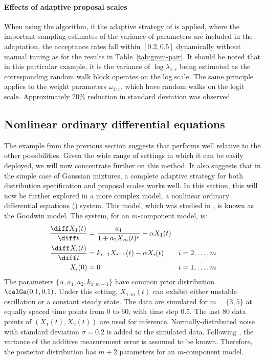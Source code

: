 \paragraph{Effects of adaptive proposal scales}

When using the \smc[2] algorithm, if the adaptive strategy of
\cite{Andrieu:2006tw} is applied, where the important sampling estimates of
the variance of parameters are included in the adaptation, the acceptance
rates fall within $[0.2, 0.5]$ dynamically without manual tuning as for the
results in Table~\ref{tab:gmm-pair}. It should be noted that in this
particular example, it is the variance of $\log\lambda_{1:r}$ being estimated
as the corresponding random walk block operates on the log scale. The same
principle applies to the weight parameters $\omega_{1:r}$, which have random
walks on the logit scale. Approximately 20\% reduction in standard deviation
was observed.

\subsection{Nonlinear ordinary differential equations}
\label{sub:Nonlinear ordinary differential equations}

The example from the previous section suggests that \smc[2] performs well
relative to the other \smc possibilities. Given the wide range of settings in
which it can be easily deployed, we will now concentrate further on this
method. It also suggests that in the simple case of Gaussian mixtures, a
complete adaptive strategy for both distribution specification and proposal
scales works well. In this section, this will now be further explored in a
more complex model, a nonlinear ordinary differential equations (\ode) system.
This model, which was studied in \cite{Calderhead:2009bd}, is known as the
Goodwin model. The \ode system, for an $m$-component model, is:
\begin{align*}
  \frac{\diff X_1(t)}{\diff t} &= \frac{a_1}{1 + a_2 X_m(t)^{\rho}}
  - \alpha X_1(t)  & \\
  \frac{\diff X_i(t)}{\diff t} &= k_{i-1}X_{i-1}(t) - \alpha X_i(t)
  & i = 2,\dots,m \\
  X_i(0) &= 0 & i = 1,\dots,m
\end{align*}
The parameters $\{\alpha,a_1,a_2,k_{1:m-1}\}$ have common prior distribution
$\calGa(0.1, 0.1)$. Under this setting, $X_{1:m}(t)$ can exhibit either
unstable oscillation or a constant steady state. The data are simulated for
$m=\{3,5\}$ at equally spaced time points from $0$ to $60$, with time step
$0.5$. The last 80 data points of $(X_1(t), X_2(t))$ are used for inference.
Normally-distributed noise with standard  deviation $\sigma=0.2$ is added to
the simulated data. Following \cite{Calderhead:2009bd}, the variance of the
additive measurement error is assumed to be known. Therefore, the posterior
distribution has $m+2$ parameters for an $m$-component model.


